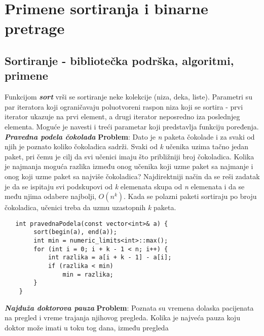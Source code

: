 \documentclass{article}
\begin{document}
\newpage

\section{Primene sortiranja i binarne pretrage}
\subsection{Sortiranje - bibliotečka podrška, algoritmi, primene}
Funkcijom \textbf{\textit{sort}} vrši se sortiranje neke kolekcije (niza, deka, liste).
Parametri su par iteratora koji ograničavaju poluotvoreni raspon niza
koji se sortira - prvi iterator ukazuje na prvi element, a drugi iterator
neposredno iza poslednjeg elementa. Moguće je navesti i treći parametar
koji predstavlja funkciju poređenja. 
\vspace{0cm} \newline
\textit{\textbf{Pravedna podela čokolada}}
\vspace{0.1cm}\newline
\textbf{Problem}: Dato je \textit{n} paketa čokolade i za svaki od njih je poznato koliko
čokoladica sadrži. Svaki od \textit{k} učenika uzima tačno jedan paket, pri čemu je cilj
da svi učenici imaju što približniji broj čokoladica. Kolika je najmanja moguća
razlika između onog učenika koji uzme paket sa najmanje i onog koji uzme paket
sa najviše čokoladica?
\newline
Najdirektniji način da se reši zadatak je da se ispitaju svi podskupovi od \textit{k}
elemenata skupa od \textit{n} elemenata i da se među njima odabere najbolji, $O(n^k)$.
\newline
Kada se polazni
paketi sortiraju po broju čokoladica, učenici treba da uzmu uzastopnih \textit{k} paketa.
\begin{lstlisting}
   int pravednaPodela(const vector<int>& a) {
        sort(begin(a), end(a));
        int min = numeric_limits<int>::max();
        for (int i = 0; i + k - 1 < n; i++) {
            int razlika = a[i + k - 1] - a[i];
            if (razlika < min)
                min = razlika;
        }
    }
\end{lstlisting}
\vspace{0.2cm}
\textit{\textbf{Najduža doktorova pauza}}
\vspace{0.1cm}\newline
\textbf{Problem}: Poznata su vremena dolaska pacijenata na pregled i vreme trajanja
njihovog pregleda.
Kolika je najveća pauza koju doktor može imati u toku tog dana, između pregleda
\end{document}
